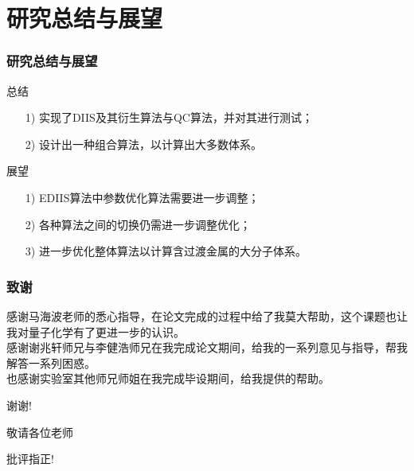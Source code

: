 \documentclass[10pt,aspectratio=43,mathserif,UTF8]{beamer}
\begin{document}
\section{研究总结与展望}

\begin{frame}
	\frametitle{研究总结与展望}
	总结
	\begin{itemize}
		\item[1)]
		 实现了DIIS及其衍生算法与QC算法，并对其进行测试；
		\item[2)] 
		 设计出一种组合算法，以计算出大多数体系。
	\end{itemize}
	
	展望
	\begin{itemize}
		\item [1)]
		EDIIS算法中参数优化算法需要进一步调整；
		\item [2)]
		各种算法之间的切换仍需进一步调整优化；
		\item [3)]
		进一步优化整体算法以计算含过渡金属的大分子体系。
	\end{itemize}
\end{frame}


%	

\begin{frame}
	\frametitle{致谢}
	感谢马海波老师的悉心指导，在论文完成的过程中给了我莫大帮助，这个课题也让我对量子化学有了更进一步的认识。\\
	感谢谢兆轩师兄与李健浩师兄在我完成论文期间，给我的一系列意见与指导，帮我解答一系列困惑。\\
	也感谢实验室其他师兄师姐在我完成毕设期间，给我提供的帮助。
\end{frame}


\begin{frame}
	\Huge{\centerline{谢谢!}}
	\Huge{\centerline{敬请各位老师}}
	\Huge{\centerline{批评指正!}}
\end{frame}

\end{document}
